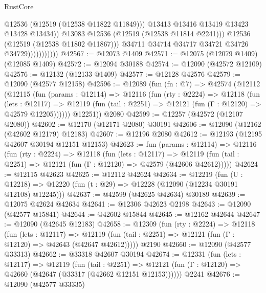\begin{lexlean}{RustCore}
\begin{coremodule}
                                    @12536
                                    (@12519 (@12538 @11822 @11849)))
                                  @13413
                                  @13416
                                  @13419
                                  @13423
                                  @13428
                                  @13434))
                              @13083
                              @12536
                              (@12519 (@12538 @11814 @2241)))
                            @12536
                            (@12519 (@12538 @11802 @11867)))
                          @34711
                          @34714
                          @34717
                          @34721
                          @34726
                          @34729)))))))))))
@42567 := @12073 @1409
@42571 := @12075 (@12079 @1409) (@12085 @1409)
@42572 := @12094 @30188
@42574 := @12090 (@42572 @12109)
@42576 := @12132 (@12133 @1409)
@42577 := @12128 @42576
@42579 := @12090 (@42577 @12158)
@42596 := @12089
    (fun (fn : @7) =>
    @42574
      (@12112
        (@12115
          (fun (params : @12114) =>
          @12116
            (fun (rty : @2224) =>
            @12118
              (fun (lets : @12117) =>
              @12119 (fun (tail : @2251) => @12121 (fun (Γ : @12120) => @42579 @12205))))))
        @12251))
    @2080
@42599 := @12257 (@42572 (@12107 @2080))
@42602 := @12170 (@12171 @2080) @30191
@42606 := @12090 (@12162 (@42602 @12179) @12183)
@42607 := @12196 @2080
@42612 := @12193 (@12195 @42607 @30194 @12151 @12153)
@42623 := fun (params : @12114) =>
  @12116
    (fun (rty : @2224) =>
    @12118
      (fun (lets : @12117) =>
      @12119 (fun (tail : @2251) => @12121 (fun (Γ : @12120) => @42579 (@42606 @42612)))))
@42624 := @12115 @42623
@42625 := @12112 @42624
@42634 := @12219
    (fun (U : @12218) => @12220 (fun (t : @29) => @12228 (@12090 (@12234 @30191 @12108) @12245)))
@42637 := @42599 (@42625 @42634) @30189
@42639 := @12075 @42624 @42634
@42641 := @12306 @42623 @2198
@42643 := @12090 (@42577 @15841)
@42644 := @42602 @15844
@42645 := @12162 @42644
@42647 := @12090 (@42645 @12183)
@42658 := @12309
    (fun (rty : @2224) =>
    @12118
      (fun (lets : @12117) =>
      @12119 (fun (tail : @2251) => @12121 (fun (Γ : @12120) => @42643 (@42647 @42612)))))
    @2190
@42660 := @12090 (@42577 @33313)
@42662 := @33318 @42607 @30194
@42674 := @12331
    (fun (lets : @12117) =>
    @12119
      (fun (tail : @2251) =>
      @12121 (fun (Γ : @12120) => @42660 (@42647 (@33317 (@42662 @12151 @12153))))))
    @2241
@42676 := @12090 (@42577 @33335)

\end{coremodule}
\end{lexlean}
